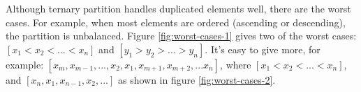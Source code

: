 \documentclass[b5paper]{article}
\begin{document}
Although ternary partition handles duplicated elements well, there are the worst cases. For example, when most elements are ordered (ascending or descending), the partition is unbalanced. Figure \ref{fig:worst-cases-1} gives two of the worst cases: $[x_1 < x_2 < ... < x_n]$ and $[y_1 > y_2 > ... > y_n]$. It's easy to give more, for example: $[x_m, x_{m-1}, ..., x_2, x_1, x_{m+1}, x_{m+2}, ... x_n]$, where $[ x_1 < x_2 < ... < x_n]$, and $[x_n, x_1, x_{n-1}, x_2, ... ]$ as shown in figure \ref{fig:worst-cases-2}.

\begin{figure}[htbp]
   \centering
    \\

\end{figure}
\end{document}
